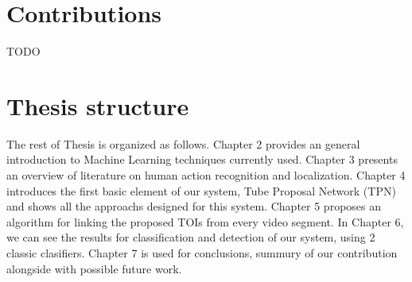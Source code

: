 \documentclass{report}
\begin{document}
\section{Contributions}
TODO

\section{Thesis structure}
The rest of Thesis is organized as follows. Chapter 2 provides an general introduction to Machine Learning techniques currently used.
Chapter 3 presents an overview of literature on human action recognition and localization. Chapter 4 introduces the first basic
element of our system, Tube Proposal Network (TPN) and shows all the approachs designed for this system. Chapter 5 proposes an algorithm
for linking the proposed TOIs from every video segment. In Chapter 6, we can see the results for classification and detection of our system,
using 2 classic clasifiers. Chapter 7 is used for conclusions, summury of our contribution alongside with possible future work.
\end{document}
